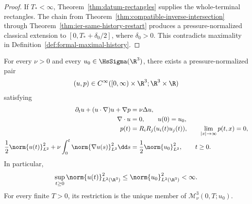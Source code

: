 \begin{proof}
If \(T_*<\infty\), Theorem~\ref{thm:datum-rectangles} supplies the
whole-terminal rectangles.  The chain from
Theorem~\ref{thm:compatible-inverse-intersection} through
Theorem~\ref{thm:ier-same-history-restart} produces a pressure-normalized classical
extension to \([0,T_*+\delta_0/2]\), where \(\delta_0>0\).  This contradicts
maximality in Definition~\ref{def:formal-maximal-history}.
\end{proof}

\begin{samepage}
\begin{theorem}
\label{thm:ier-global-smoothness}
For every \(\nu>0\) and every \(u_0\in\HsSigma(\R^3)\), there exists a
pressure-normalized pair
\begin{equation}
 (u,p)\in C^\infty([0,\infty)\times\R^3;\R^3\times\R)
 \label{eq:ier-global-class}
\end{equation}
satisfying
\begin{align}
 \partial_tu+(u\cdot\nabla)u+\nabla p&=\nu\Delta u,
 \label{eq:ier-global-momentum}\\
 \nabla\cdot u&=0,
 \qquad u(0)=u_0,
 \label{eq:ier-global-divergence-datum}\\
 p(t)&=R_iR_j(u_i(t)u_j(t)),
 \qquad \lim_{|x|\to\infty}p(t,x)=0,
 \label{eq:ier-global-pressure}\\
 \frac12\norm{u(t)}_{L^2}^2
 +\nu\int_0^t\norm{\nabla u(s)}_{L^2}^2\dd s
 &=\frac12\norm{u_0}_{L^2}^2,
 \qquad t\ge0.
 \label{eq:ier-global-energy}
\end{align}
In particular,
\begin{equation}
 \sup_{t\ge0}\norm{u(t)}_{L^2(\R^3)}^2
 \le\norm{u_0}_{L^2(\R^3)}^2<\infty.
 \label{eq:ier-global-energy-bound}
\end{equation}
For every finite \(T>0\), its restriction is the unique member of
\(\mathscr M_\nu^3(0,T;u_0)\).
\end{theorem}
\end{samepage}

